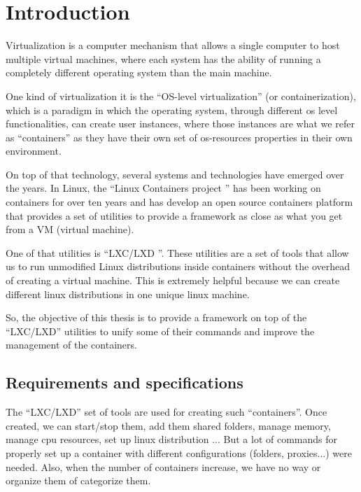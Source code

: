 
\clearpage\section{Introduction}\label{sec:introduction}         %

Virtualization is a computer mechanism that allows a single computer to host multiple virtual machines, where each system has the ability of running a completely different operating system than the main machine. 

One kind of virtualization it is the ``OS-level virtualization'' (or containerization), which is a paradigm in which the operating system, through different os level functionalities, can create user instances, where those instances are what we refer as ``containers'' as they have their own set of os-resources properties in their own environment.

On top of that technology, several systems and technologies have emerged over the years. In Linux, the ``Linux Containers project \cite{linux-containers}'' has been working on containers for over ten years and has develop an open source containers platform that provides a set of utilities to provide a framework as close as what you get from a VM (virtual machine). 

One of that utilities is ``LXC/LXD \cite{lxc}\cite{lxd}''. These utilities are a set of tools that allow us to run unmodified Linux distributions inside containers without the overhead of creating a virtual machine. This is extremely helpful because we can create different linux distributions in one unique linux machine.

So, the objective of this thesis is to provide a framework on top of the ``LXC/LXD'' utilities to unify some of their commands and improve the management of the containers.

\bigskip

\subsection{Requirements and specifications}
\label{ssec:requirements}
The ``LXC/LXD'' set of tools are used for creating such ``containers''. Once created, we can start/stop them, add them shared folders, manage memory, manage cpu resources, set up linux distribution ...
But a lot of commands for properly set up a container with different configurations (folders, proxies...) were needed. Also, when the number of containers increase, we have no way or organize them of categorize them.

